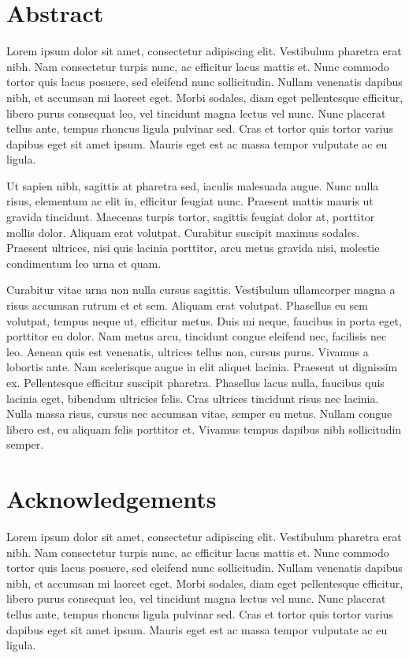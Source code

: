 \documentclass[a4paper]{memoir}
\begin{document}
\chapter*{Abstract}

\label{abstract}

Lorem ipsum dolor sit amet, consectetur adipiscing elit. Vestibulum pharetra erat nibh. Nam consectetur turpis nunc, ac efficitur lacus mattis et. Nunc commodo tortor quis lacus posuere, sed eleifend nunc sollicitudin. Nullam venenatis dapibus nibh, et accumsan mi laoreet eget. Morbi sodales, diam eget pellentesque efficitur, libero purus consequat leo, vel tincidunt magna lectus vel nunc. Nunc placerat tellus ante, tempus rhoncus ligula pulvinar sed. Cras et tortor quis tortor varius dapibus eget sit amet ipsum. Mauris eget est ac massa tempor vulputate ac eu ligula. 

Ut sapien nibh, sagittis at pharetra sed, iaculis malesuada augue. Nunc nulla risus, elementum ac elit in, efficitur feugiat nunc. Praesent mattis mauris ut gravida tincidunt. Maecenas turpis tortor, sagittis feugiat dolor at, porttitor mollis dolor. Aliquam erat volutpat. Curabitur suscipit maximus sodales. Praesent ultrices, nisi quis lacinia porttitor, arcu metus gravida nisi, molestie condimentum leo urna et quam. 

Curabitur vitae urna non nulla cursus sagittis. Vestibulum ullamcorper magna a risus accumsan rutrum et et sem. Aliquam erat volutpat. Phasellus eu sem volutpat, tempus neque ut, efficitur metus. Duis mi neque, faucibus in porta eget, porttitor eu dolor. Nam metus arcu, tincidunt congue eleifend nec, facilisis nec leo. Aenean quis est venenatis, ultrices tellus non, cursus purus. Vivamus a lobortis ante. Nam scelerisque augue in elit aliquet lacinia. Praesent ut dignissim ex. Pellentesque efficitur suscipit pharetra. Phasellus lacus nulla, faucibus quis lacinia eget, bibendum ultricies felis. Cras ultrices tincidunt risus nec lacinia. Nulla massa risus, cursus nec accumsan vitae, semper eu metus. Nullam congue libero est, eu aliquam felis porttitor et. Vivamus tempus dapibus nibh sollicitudin semper. 


\chapter*{Acknowledgements}
\label{acknowledgments}

Lorem ipsum dolor sit amet, consectetur adipiscing elit. Vestibulum pharetra erat nibh. Nam consectetur turpis nunc, ac efficitur lacus mattis et. Nunc commodo tortor quis lacus posuere, sed eleifend nunc sollicitudin. Nullam venenatis dapibus nibh, et accumsan mi laoreet eget. Morbi sodales, diam eget pellentesque efficitur, libero purus consequat leo, vel tincidunt magna lectus vel nunc. Nunc placerat tellus ante, tempus rhoncus ligula pulvinar sed. Cras et tortor quis tortor varius dapibus eget sit amet ipsum. Mauris eget est ac massa tempor vulputate ac eu ligula. 
\end{document}
